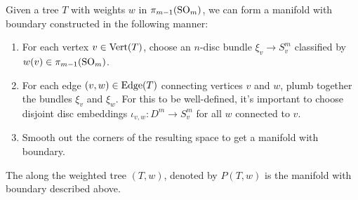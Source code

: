 \begin{figure}[ht]
	\vspace{1em}
	\caption{}
\end{figure}

Given a tree $T$ with weights $w$ in $\pi_{m-1}({\operatorname{SO}}_m)$, we can form a manifold with boundary constructed in the following manner:
\begin{enumerate}
	\item For each vertex $v\in {\operatorname{Vert}}(T)$, choose an $n$-disc bundle $\xi_v\to S^m_v$ classified by $w(v)\in \pi_{m-1}({\operatorname{SO}}_m)$.
	\item For each edge $(v,w)\in {\operatorname{Edge}}(T)$ connecting vertices $v$ and $w$, plumb together the bundles $\xi_v$ and $\xi_w$. For this to be well-defined, it's important to choose disjoint disc embeddings $\iota_{v,w} : D^m \to S^m_v$ for all $w$ connected to $v$.
	\item Smooth out the corners of the resulting space to get a manifold with boundary.
\end{enumerate}
\begin{definition}
	The  along the weighted tree $(T,w)$, denoted by $P(T,w)$ is the manifold with boundary described above.
\end{definition}

